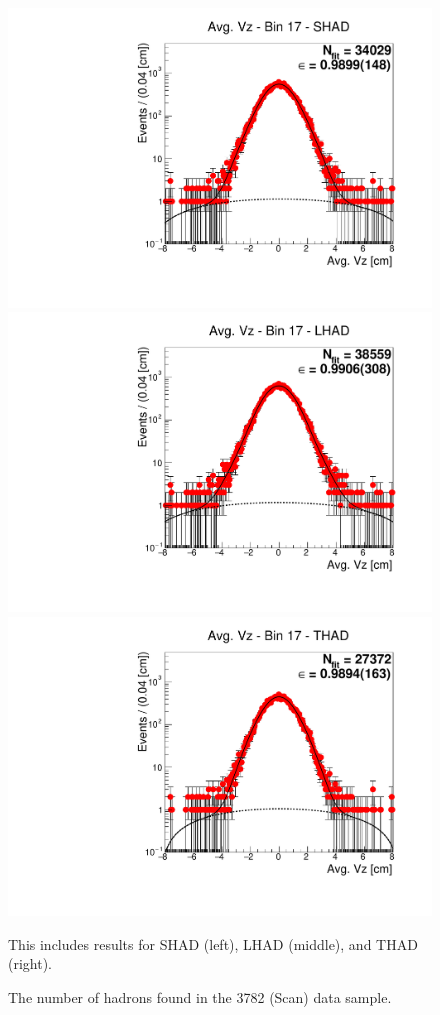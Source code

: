 \begin{figure}[H]
\centering
\includegraphics[scale=0.25]{figures/plots/nonDDbar_fit_results/scan/fit_scan_17_data_SHAD.pdf}
\hspace{-0.5cm}
\includegraphics[scale=0.25]{figures/plots/nonDDbar_fit_results/scan/fit_scan_17_data_LHAD.pdf}
\hspace{-0.5cm}
\includegraphics[scale=0.25]{figures/plots/nonDDbar_fit_results/scan/fit_scan_17_data_THAD.pdf}
\caption{The number of hadrons found in the 3782 (Scan) data sample.}
{This includes results for SHAD (left), LHAD (middle), and THAD (right).}
\label{fig:hadron_fits_scan_17}
\end{figure}

